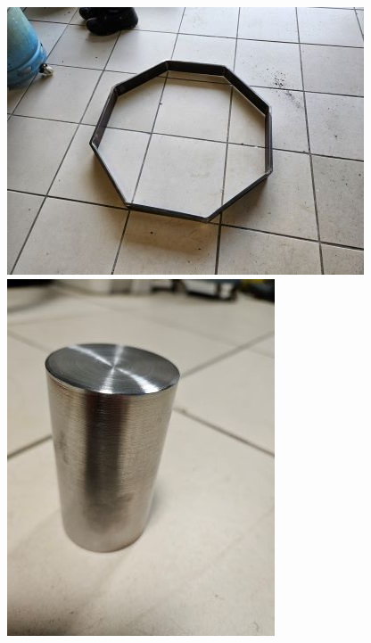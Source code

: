 \documentclass{article}
\begin{document}
\begin{figure}[H]
    \centering
    \begin{minipage}{0.3\textwidth}
    \centering
        \includegraphics[width=\linewidth, angle=0]{Images/photoFabrications/octogone1.jpg}
    \end{minipage}\hfill
    \begin{minipage}{0.3\textwidth}
     
        \includegraphics[width=\linewidth, angle=270]{Images/photoFabrications/support_bobine.jpg}
        

\end{minipage}
\end{figure}
\end{document}
